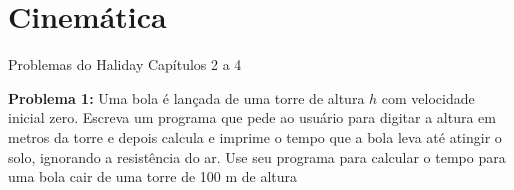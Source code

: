 \chapter{Cinemática}
Problemas do Haliday Capítulos 2 a 4

{\bf Problema 1:}
Uma bola é lançada de uma torre de altura $h$ com velocidade inicial zero. Escreva um
programa que pede ao usuário para digitar a altura em metros da torre e depois calcula
e imprime o tempo que a bola leva até atingir o solo, ignorando a resistência do ar. Use
seu programa para calcular o tempo para uma bola cair de uma torre de 100 m de altura
